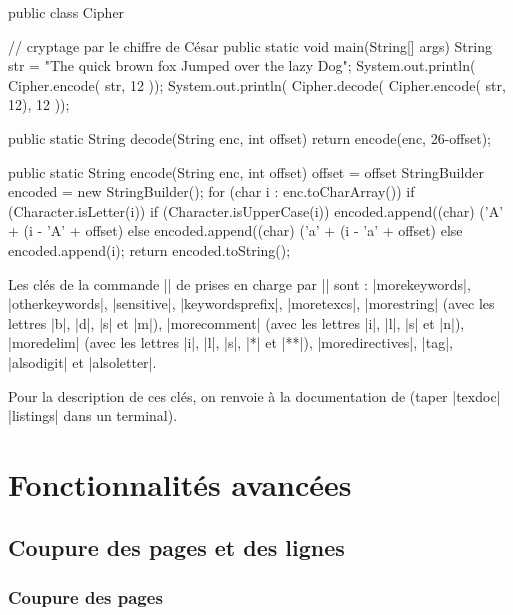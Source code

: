 \documentclass[dvipsnames,svgnames]{article}
\begin{document}
\bigskip
\begingroup
\small
{}
\begin{Piton}[language = Java]
public class Cipher { // cryptage par le chiffre de César
    public static void main(String[] args) {
        String str = "The quick brown fox Jumped over the lazy Dog";
        System.out.println( Cipher.encode( str, 12 ));
        System.out.println( Cipher.decode( Cipher.encode( str, 12), 12 ));
    }

    public static String decode(String enc, int offset) {
        return encode(enc, 26-offset);
    }

    public static String encode(String enc, int offset) {
        offset = offset %
        StringBuilder encoded = new StringBuilder();
        for (char i : enc.toCharArray()) {
            if (Character.isLetter(i)) {
                if (Character.isUpperCase(i)) {
                    encoded.append((char) ('A' + (i - 'A' + offset) %
                } else {
                    encoded.append((char) ('a' + (i - 'a' + offset) %
                }
            } else {
                encoded.append(i);
            }
        }
        return encoded.toString();
    }
}
\end{Piton}
\endgroup

\bigskip
Les clés de la commande |\lstdeflinelanguage| de  prises en charge par |\NewPitonLanguage| sont :
|morekeywords|, |otherkeywords|, |sensitive|, |keywordsprefix|, |moretexcs|, |morestring| (avec les lettres |b|,
|d|, |s| et |m|), |morecomment| (avec les lettres |i|, |l|, |s| et |n|), |moredelim| (avec les lettres |i|,
|l|, |s|, |*| et |**|), |moredirectives|, |tag|, |alsodigit| et |alsoletter|.

Pour la description de ces clés, on renvoie à la documentation de  (taper |texdoc| |listings| dans un terminal). 



\section{Fonctionnalités avancées}


\subsection{Coupure des pages et des lignes}

\label{breakable}

\subsubsection{Coupure des pages}
\end{document}
